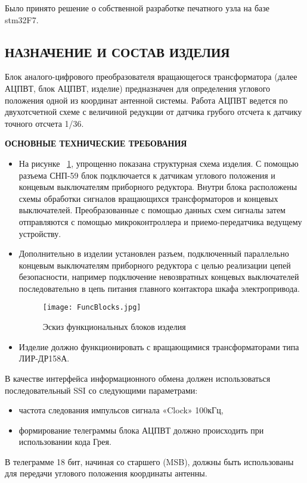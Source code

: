 Было принято решение о собственной разработке печатного узла на базе stm32F7.


\subsection{НАЗНАЧЕНИЕ И СОСТАВ ИЗДЕЛИЯ}

Блок аналого-цифрового преобразователя вращающегося трансформатора (далее АЦПВТ, блок АЦПВТ, изделие) предназначен для определения углового положения одной из координат антенной системы. 
Работа АЦПВТ ведется по двухотсчетной схеме с величиной редукции от датчика грубого отсчета к датчику точного отсчета 1/36.  

\textbf{ОСНОВНЫЕ ТЕХНИЧЕСКИЕ ТРЕБОВАНИЯ}

\begin{itemize}
    \item На рисунке ~\ref{FuncBlocks}, упрощенно показана структурная схема изделия. 
          С помощью разъема СНП-59 блок подключается к датчикам углового положения и концевым выключателям приборного редуктора. 
          Внутри блока расположены схемы обработки сигналов вращающихся трансформаторов и концевых выключателей. 
          Преобразованные с помощью данных схем сигналы затем отправляются с помощью микроконтроллера и приемо-передатчика ведущему устройству.  

    \item Дополнительно в изделии установлен разъем, подключенный параллельно концевым выключателям приборного редуктора с целью реализации цепей безопасности, 
          например подключение невозвратных концевых выключателей последовательно в цепь питания главного контактора шкафа электропривода. 

        \begin{figure}[!t]
          \centering
          \texttt{[image: FuncBlocks.jpg]} 
          \caption{Эскиз функциональных блоков изделия}
          \label{FuncBlocks}
        \end{figure}

    \item Изделие должно функционировать с вращающимися трансформаторами типа ЛИР-ДР158А.
      \end{itemize}


    В качестве интерфейса информационного обмена должен использоваться последовательный SSI со следующими параметрами:
    \begin{itemize}
          \item частота следования импульсов сигнала «Clock» 100кГц,
          \item  формирование телеграммы блока АЦПВТ должно происходить при использовании кода Грея. 
    \end{itemize}
    В телеграмме 18 бит, начиная со старшего (MSB), должны быть использованы для передачи углового положения координаты антенны. 

